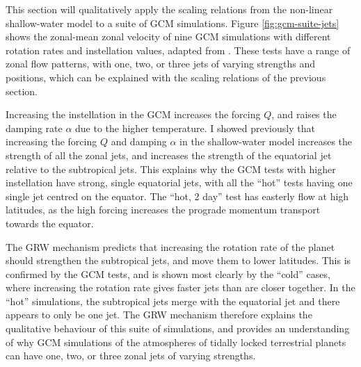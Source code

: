 This section will qualitatively apply the scaling relations from the non-linear shallow-water model to a suite of GCM simulations. Figure \ref{fig:gcm-suite-jets} shows the zonal-mean zonal velocity of nine GCM simulations with different rotation rates and instellation values, adapted from \citet{pierrehumbert2018review}. These tests have a range of zonal flow patterns, with one, two, or three jets of varying strengths and positions, which can be explained with the scaling relations of the previous section.

 Increasing the instellation in the GCM increases the forcing $Q$, and raises the damping rate $\alpha$ due to the higher temperature. I showed previously that increasing the forcing $Q$ and damping $\alpha$ in the shallow-water model increases the strength of all the zonal jets, and increases the strength of the equatorial jet relative to the subtropical jets. This explains why the GCM tests with higher instellation have strong, single equatorial jets, with all the ``hot'' tests having one single jet centred on the equator. The ``hot, 2 day'' test has easterly flow at high latitudes, as the high forcing increases the prograde momentum transport towards the equator.

The GRW mechanism predicts that increasing the rotation rate of the planet should strengthen the subtropical jets, and move them to lower latitudes. This is confirmed by the GCM tests, and is shown most clearly by the ``cold'' cases, where increasing the rotation rate gives faster jets than are closer together. In the ``hot'' simulations, the subtropical jets merge with the equatorial jet and there appears to only be one jet. The GRW mechanism therefore explains the qualitative behaviour of this suite of simulations, and provides an understanding of why GCM simulations of the atmospheres of tidally locked terrestrial planets can have one, two, or three zonal jets of varying strengths.


